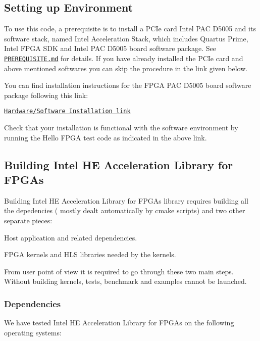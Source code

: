 \subsection*{Setting up Environment}

To use this code, a prerequisite is to install a P\-C\-Ie card Intel P\-A\-C D5005 and its software stack, named Intel Acceleration Stack, which includes Quartus Prime, Intel F\-P\-G\-A S\-D\-K and Intel P\-A\-C D5005 board software package. See \href{PREREQUISITE.md}{\tt P\-R\-E\-R\-E\-Q\-U\-I\-S\-I\-T\-E.\-md} for details. If you have already installed the P\-C\-Ie card and above mentioned softwares you can skip the procedure in the link given below. \par


You can find installation instructions for the F\-P\-G\-A P\-A\-C D5005 board software package following this link\-: \par
 \href{https://www.intel.com/content/www/us/en/programmable/documentation/edj1542148561811.html}{\tt Hardware/\-Software Installation link}

Check that your installation is functional with the software environment by running the Hello F\-P\-G\-A test code as indicated in the above link. \par


\subsection*{Building Intel H\-E Acceleration Library for F\-P\-G\-As}

Building Intel H\-E Acceleration Library for F\-P\-G\-As library requires building all the depedencies ( mostly dealt automatically by cmake scripts) and two other separate pieces\-:
\begin{DoxyItemize}
\item Host application and related dependencies.
\item F\-P\-G\-A kernels and H\-L\-S libraries needed by the kernels.
\end{DoxyItemize}

From user point of view it is required to go through these two main steps. Without building kernels, tests, benchmark and examples cannot be launched.

\subsubsection*{Dependencies}

We have tested Intel H\-E Acceleration Library for F\-P\-G\-As on the following operating systems\-: \par

